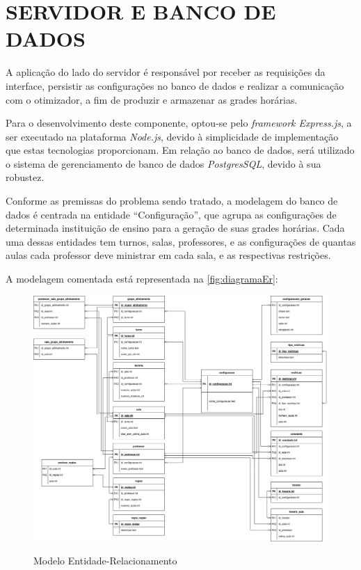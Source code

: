 \section{SERVIDOR E BANCO DE DADOS}

A aplicação do lado do servidor é responsável por receber as requisições da interface, persistir as configurações no banco de dados e realizar a comunicação com o otimizador, a fim de produzir e armazenar as grades horárias.

Para o desenvolvimento deste componente, optou-se pelo \textit{framework Express.js}, a ser executado na plataforma \textit{Node.js}, devido à simplicidade de implementação que estas tecnologias proporcionam. Em relação ao banco de dados, será utilizado o sistema de gerenciamento de banco de dados \textit{PostgresSQL}, devido à sua robustez.

Conforme as premissas do problema sendo tratado, a modelagem do banco de dados é centrada na entidade ``Configuração'', que agrupa as configurações de determinada instituição de ensino para a geração de suas grades horárias. Cada uma dessas entidades tem turnos, salas, professores, e as configurações de quantas aulas cada professor deve ministrar em cada sala, e as respectivas restrições.

A modelagem comentada está representada na \autoref{fig:diagramaEr}:

\begin{figure}[!htb]
	\centering
	\caption{Modelo Entidade-Relacionamento}
	\includegraphics[width=1\textwidth]{./dados/figuras/diagrama_er}
	\label{fig:diagramaEr}
\end{figure}
\newpage

